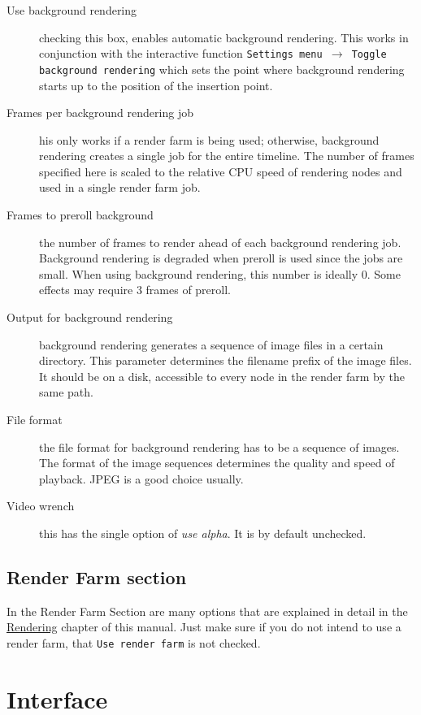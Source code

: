 \begin{description}
    \item[Use background rendering] checking this box, enables automatic background rendering.  This works in conjunction with the interactive function \texttt{Settings menu $\rightarrow$ Toggle background rendering} which sets the point where background rendering starts up to the position of the insertion point.
    \item[Frames per background rendering job] his only works if a render farm is being used; otherwise, background rendering creates a single job for the entire timeline. The number of frames specified here is scaled to the relative CPU speed of rendering nodes and used in a single render farm job.
    \item[Frames to preroll background] the number of frames to render ahead of each background rendering job. Background rendering is degraded when preroll is used since the jobs are small. When using background rendering, this number is ideally 0. Some effects may require 3 frames of preroll.
    \item[Output for background rendering] background rendering generates a sequence of image files in a certain directory. This parameter determines the filename prefix of the image files. It should be on a disk, accessible to every node in the render farm by the same path.
    \item[File format] the file format for background rendering has to be a sequence of images. The format of the image sequences determines the quality and speed of playback. JPEG is a good choice usually.
    \item[Video wrench] this has the single option of \textit{use alpha}.  It is by default unchecked.
\end{description}

\subsection{Render Farm section}%
\label{sub:render_farm_section}

In the Render Farm Section are many options that are explained in detail in the \hyperref[sec:render_farm_usage]{Rendering} chapter of this manual.  Just make sure if you do not intend to use a render farm, that \texttt{Use render farm} is not checked.

\section{Interface}%
\label{sec:interface}

